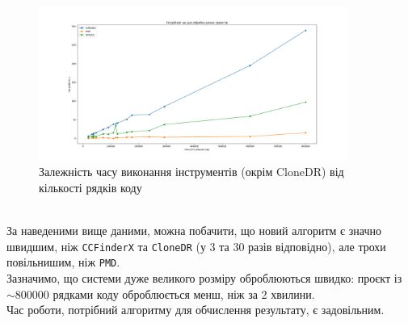 \documentclass[a4paper, 14pt]{article}
\begin{document}
\begin{figure}[h]
    \centering
    \includegraphics[width=0.9\textwidth]{graph2}
    \caption{\centering Залежність часу виконання інструментів (окрім CloneDR) від кількості рядків коду \label{fig:graphd2}}
\end{figure} \hfill \\
За наведеними вище даними, можна побачити, що новий алгоритм є значно швидшим, ніж \verb|CCFinderX| та \verb|CloneDR| (у $3$ та $30$ разів відповідно), але трохи повільнишим, ніж \verb|PMD|. \\
Зазначимо, що системи дуже великого розміру оброблюються швидко: проєкт із $\sim$800000 рядками коду оброблюється менш, ніж за 2 хвилини. \\
Час роботи, потрібний алгоритму для обчислення результату, є задовільним.
\end{document}
